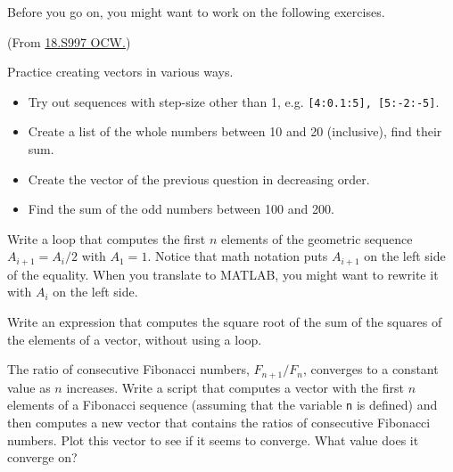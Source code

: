 Before you go on, you might want to work on the following exercises.

\begin{ex}
(From \href{https://ocw.mit.edu/courses/18-s997-introduction-to-matlab-programming-fall-2011/pages/the-basics/lists-vectors-and-matrices/}{18.S997 OCW.})

Practice creating vectors in various ways.
\begin{itemize}
\item Try out sequences with step-size other than 1, e.g. \lstinline{[4:0.1:5], [5:-2:-5]}.
\item Create a list of the whole numbers between 10 and 20 (inclusive), find their sum.
\item Create the vector of the previous question in decreasing order.
\item Find the sum of the odd numbers between 100 and 200.
\end{itemize}
\end{ex}

\begin{ex}
Write a loop that computes the first $n$ elements
of the geometric sequence $A_{i+1} = A_i/2$ with $A_1 = 1$.  Notice that
math notation puts $A_{i+1}$ on the left side of the equality.
When you translate to MATLAB, you might want to rewrite it with
$A_{i}$ on the left side.
\end{ex}


\begin{ex}
Write an expression that computes the square root of the sum of the squares of the elements of a vector, without using a loop.
\end{ex}



\begin{ex}
\label{fibratio}

The ratio of consecutive Fibonacci numbers, $F_{n+1}/F_{n}$, converges
to a constant value as $n$ increases.  Write a script that computes
a vector with the first $n$ elements of a Fibonacci sequence (assuming
that the variable \lstinline{n} is defined) and then computes a new
vector that contains the ratios of consecutive Fibonacci numbers.
Plot this vector to see if it seems to converge.  What value does
it converge on?


\end{ex}


